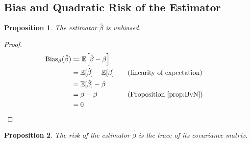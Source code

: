 \documentclass[letterpaper, reqno]{amsart}
\newtheorem{prop}{Proposition}[section]
\numberwithin{equation}{section}
\newcommand{\E}[1]{\mathbb{E}\mleft[#1\mright]}
\newcommand{\by}[1]{&\quad&\text{(#1)}}
\newcommand{\Bv}{\beta}
\newcommand{\Bvh}{\hat{\beta}}
\newcommand{\Ebh}{\mathbb{E}[\Bvh]}
\begin{document}
\subsection{Bias and Quadratic Risk of the Estimator}
\begin{prop} \label{prop:bhat_nobias}
  The estimator $\Bvh$ is unbiased.
\end{prop}

\begin{proof}
  \begin{alignat*}{3}
    \mathrm{Bias}_\Bv(\Bvh) &\coloneqq \E{\Bvh - \Bv} \\
    &= \Ebh - \E{\Bv} \by{linearity of expectation} \\
    &= \Ebh - \Bv \\
    &= \Bv - \Bv \by{Proposition~\ref{prop:BvN}} \\
    &= 0 \tag*{\qedhere}
  \end{alignat*}
\end{proof}

\begin{prop}
  The risk of the estimator $\Bvh$ is the trace of its covariance matrix.
\end{prop}
\end{document}
